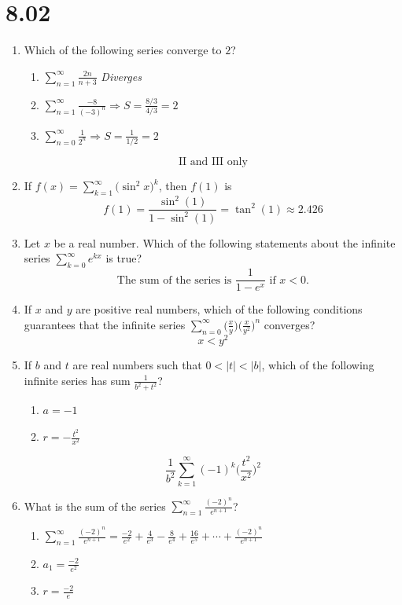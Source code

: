 \documentclass[12pt]{article}
\begin{document}
\section*{8.02}
\begin{enumerate}
	\item Which of the following series converge to $2$?
	      \begin{enumerate}[label=\Roman*.]
	      	\item $\sum_{n=1}^{\infty} \frac{2n}{n+3}$ \textit{Diverges}  
	      	\item $\sum_{n=1}^{\infty} \frac{-8}{(-3)^n} \Longrightarrow S = \frac{8/3}{4/3} = 2$ 
	      	\item $\sum_{n=0}^{\infty} \frac{1}{2^n} \Longrightarrow S = \frac{1}{1/2} = 2$
	      \end{enumerate}
		$$\boxed{\text{II and III only}}$$
	\item If $f(x)=\sum_{k=1}^{\infty} \big(\sin^2 x \big)^k$, then $f(1)$ is
	$$f(1)= \frac{\sin^2(1)}{1-\sin^2(1)} = \tan^2(1) \approx \boxed{2.426}$$
	\item Let $x$ be a real number. Which of the following statements about the infinite series $\sum_{k=0}^{\infty}e^{kx}$ is true?
	$$\boxed{\text{The sum of the series is } \frac{1}{1-e^x} \text{ if } x<0 \text{.}}$$
	\item If $x$ and $y$ are positive real numbers, which of the following conditions guarantees that the infinite series $\sum_{n=0}^{\infty} \big(\frac{x}{y}\big)\big(\frac{x}{y^2}\big)^n$ converges?
	$$\boxed{x<y^2}$$
	\item If $b$ and $t$ are real numbers such that $0<|t|<|b|$, which of the following infinite series has sum $\frac{1}{b^2+t^2}$?
	\begin{enumerate}
		\item $a = -1$
		\item $r = -\frac{t^2}{x^2}$
	\end{enumerate}
	$$\boxed{\frac{1}{b^2} \sum_{k=1}^{\infty}(-1)^k \bigg(\frac{t^2}{x^2}\bigg)^2}$$
	\item What is the sum of the series $\sum_{n=1}^{\infty}\frac{(-2)^n}{e^{n+1}}$?
		\begin{enumerate}
			\item $\sum_{n=1}^{\infty} \frac{(-2)^n}{e^{n+1}} = \frac{-2}{e^2} + \frac{4}{e^3} - \frac{8}{e^4} + \frac{16}{e^5} + \cdots + \frac{(-2)^n}{e^{n+1}}$
			\item $a_1 = \frac{-2}{e^2}$
			\item $r= \frac{-2}{e}$

\end{enumerate}
\end{enumerate}
\end{document}
